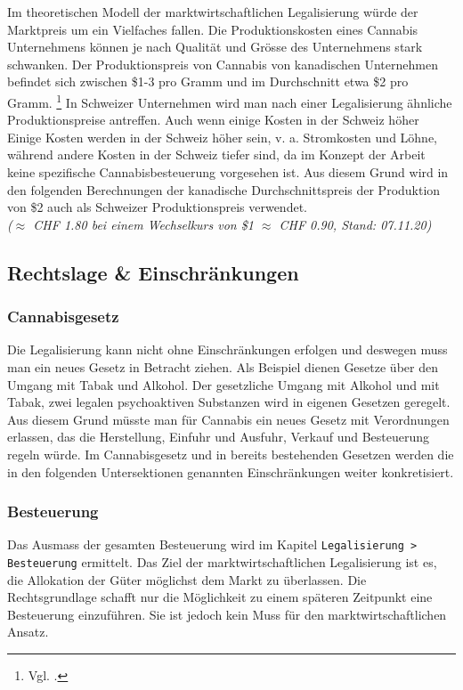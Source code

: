 \documentclass[../main.tex]{subfiles}
\begin{document}
	 \noindent
	 Im theoretischen Modell der marktwirtschaftlichen Legalisierung würde der Marktpreis um ein Vielfaches fallen.
	 Die Produktionskosten eines Cannabis Unternehmens können je nach Qualität und Grösse des Unternehmens stark schwanken.
	 Der Produktionspreis von Cannabis von kanadischen Unternehmen befindet sich zwischen \$1-3 pro Gramm und im Durchschnitt etwa \$2 pro Gramm.%
	 \footnote{Vgl. \cite{seekingalpha-01}.}
	 In Schweizer Unternehmen wird man nach einer Legalisierung ähnliche Produktionspreise antreffen. 
	 Auch wenn einige Kosten in der Schweiz höher
	 Einige Kosten werden in der Schweiz höher sein, v. a. Stromkosten und Löhne, während andere Kosten in der Schweiz tiefer sind, da im Konzept der Arbeit keine spezifische Cannabisbesteuerung vorgesehen ist.
	 Aus diesem Grund wird in den folgenden Berechnungen der kanadische Durchschnittspreis der Produktion von \$2 auch als Schweizer Produktionspreis verwendet.\\
	 \textit{($\approx$ CHF 1.80 bei einem Wechselkurs von \$1 $\approx$ CHF 0.90, Stand: 07.11.20)}
	 

	 \pagebreak	 
	 
	 \subsection{Rechtslage \& Einschränkungen}
	 
	 \subsubsection{Cannabisgesetz}
	 Die Legalisierung kann nicht ohne Einschränkungen erfolgen und deswegen muss man ein neues Gesetz in Betracht ziehen.
	 Als Beispiel dienen Gesetze über den Umgang mit Tabak und Alkohol.
	 Der gesetzliche Umgang mit Alkohol und mit Tabak, zwei legalen psychoaktiven Substanzen wird in eigenen Gesetzen geregelt. 
	 Aus diesem Grund müsste man für Cannabis ein neues Gesetz mit Verordnungen erlassen, das die Herstellung, Einfuhr und Ausfuhr, Verkauf und Besteuerung regeln würde.	 
	 Im Cannabisgesetz und in bereits bestehenden Gesetzen werden die in den folgenden Untersektionen genannten Einschränkungen weiter konkretisiert.
	 
	 \subsubsection{Besteuerung}
	 Das Ausmass der gesamten Besteuerung wird im Kapitel \texttt{Legalisierung > Besteuerung} ermittelt.
	 Das Ziel der marktwirtschaftlichen Legalisierung ist es, die Allokation der Güter möglichst dem Markt zu überlassen.
	 Die Rechtsgrundlage schafft nur die Möglichkeit zu einem späteren Zeitpunkt eine Besteuerung einzuführen. 
	 Sie ist jedoch kein Muss für den marktwirtschaftlichen Ansatz.\\
	 
\end{document}
